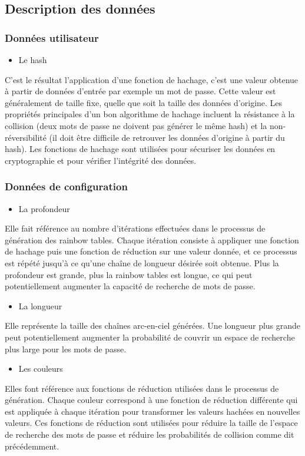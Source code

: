 \documentclass[a4paper,12pt]{article}
\begin{document}
\subsection{Description des données}
\subsubsection{Données utilisateur}
\begin{itemize}
    \item Le hash
\end{itemize}
C'est le résultat l'application d'une fonction de hachage, c'est une valeur obtenue à partir de données d'entrée par exemple un mot de passe. Cette valeur est généralement de taille fixe, quelle que soit la taille des données d'origine. Les propriétés principales d'un bon algorithme de hachage incluent la résistance à la collision (deux mots de passe ne doivent pas générer le même hash) et la non-réversibilité (il doit être difficile de retrouver les données d'origine à partir du hash). Les fonctions de hachage sont utilisées pour sécuriser les données en cryptographie et pour vérifier l'intégrité des données.

\subsubsection{Données de configuration}
\begin{itemize}
    \item La profondeur
\end{itemize}
Elle fait référence au nombre d'itérations effectuées dans le processus de génération des rainbow tables. Chaque itération consiste à appliquer une fonction de hachage puis une fonction de réduction sur une valeur donnée, et ce processus est répété jusqu'à ce qu'une chaîne de longueur désirée soit obtenue. Plus la profondeur est grande, plus la rainbow tables est longue, ce qui peut potentiellement augmenter la capacité de recherche de mots de passe.\\

\begin{itemize}
    \item La longueur
\end{itemize}
Elle représente la taille des chaînes arc-en-ciel générées. Une longueur plus grande peut potentiellement augmenter la probabilité de couvrir un espace de recherche plus large pour les mots de passe.\\

\begin{itemize}
    \item Les couleurs
\end{itemize}
Elles font référence aux fonctions de réduction utilisées dans le processus de génération. Chaque couleur correspond à une fonction de réduction différente qui est appliquée à chaque itération pour transformer les valeurs hachées en nouvelles valeurs. Ces fonctions de réduction sont utilisées pour réduire la taille de l'espace de recherche des mots de passe et réduire les probabilités de collision comme dit précédemment.
\end{document}

